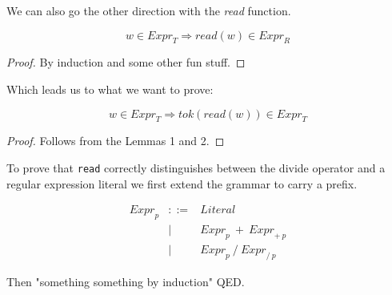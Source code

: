 \documentclass[preprint,10pt]{sigplanconf}
\begin{document}
We can also go the other direction with the \textit{read} function.

  \begin{lemma}[]
\[
    w \in \textit{Expr}_T
    \Rightarrow
    \textit{read}(w) \in \textit{Expr}_R
\]
  \end{lemma}
  \begin{proof}
    By induction and some other fun stuff.
  \end{proof}

Which leads us to what we want to prove:

  \begin{theorem}[]
\[
    w \in \textit{Expr}_T
    \Rightarrow
    \textit{tok}(\textit{read}(w)) \in \textit{Expr}_T
\]
  \end{theorem}
  \begin{proof}
    Follows from the Lemmas 1 and 2.
  \end{proof}

To prove that \texttt{read} correctly distinguishes between the divide
operator and a regular expression literal we first extend the grammar
to carry a prefix.



\[
\begin{array}{rrl}
  \textit{Expr}_{p} &::=& \textit{Literal}
  \\
  &|& \textit{Expr}_{p}~+~\textit{Expr}_{+~p}
  \\
  &|& \textit{Expr}_{p}~/~\textit{Expr}_{/~p}
\end{array}
\]

Then "something something by induction" QED.
\end{document}
